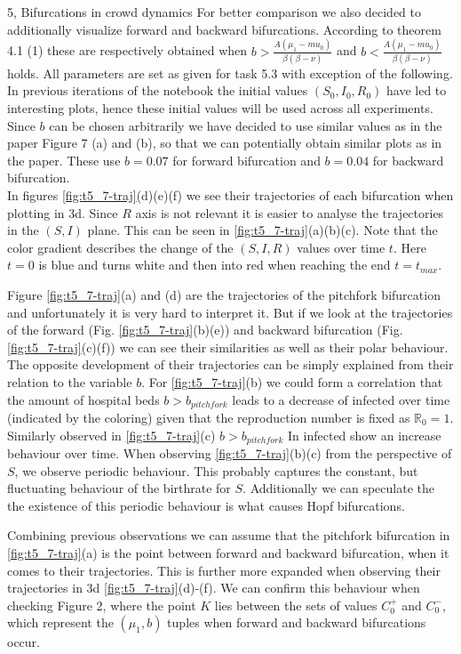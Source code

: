 \begin{task}{5, Bifurcations in crowd dynamics}
For better comparison we also decided to additionally visualize forward and backward bifurcations. According to theorem 4.1 (1) these are respectively obtained when
$b > \frac{A(\mu_1 -mu_0)}{\beta (\beta -\nu)}$ and $b < \frac{A(\mu_1 -mu_0)}{\beta (\beta -\nu)}$ holds. All parameters are set as given for task 5.3 with exception of the following. In previous iterations of the notebook the initial values $(S_0, I_0, R_0)$ have led to interesting plots, hence these initial values will be used across all experiments. Since $b$ can be chosen arbitrarily we have decided to use similar values as in the paper \cite{shan2014bifurcations} Figure 7 (a) and (b), so that we can potentially obtain similar plots as in the paper. These use $b=0.07$ for forward bifurcation and $b=0.04$ for backward bifurcation.\\

In figures \ref{fig:t5_7-traj}(d)(e)(f) we see their trajectories of each bifurcation when plotting in 3d. Since $R$ axis is not relevant it is easier to analyse the trajectories in the $(S,I)$ plane. This can be seen in \ref{fig:t5_7-traj}(a)(b)(c). Note that the color gradient describes the change of the $(S,I,R)$ values over time $t$. Here $t=0$ is blue and turns white and then into red when reaching the end $t=t_{max}$.

Figure \ref{fig:t5_7-traj}(a) and (d) are the trajectories of the pitchfork bifurcation and unfortunately it is very hard to interpret it. But if we look at the trajectories of the forward (Fig. \ref{fig:t5_7-traj}(b)(e)) and backward bifurcation (Fig. \ref{fig:t5_7-traj}(c)(f)) we can see their similarities as well as their polar behaviour. The opposite development of their trajectories can be simply explained from their relation to the variable $b$. For \ref{fig:t5_7-traj}(b) we could form a correlation that the amount of hospital beds $b>b_{pitchfork}$ leads to a decrease of infected over time (indicated by the coloring) given that the reproduction number is fixed as $\mathbb{R}_0=1$. Similarly observed in \ref{fig:t5_7-traj}(c) $b>b_{pitchfork}$ In infected show an increase behaviour over time. When observing \ref{fig:t5_7-traj}(b)(c) from the perspective of $S$, we observe periodic behaviour. This probably captures the constant, but fluctuating behaviour of the birthrate for $S$. Additionally we can speculate the the existence of this periodic behaviour is what causes Hopf bifurcations.

Combining previous observations we can assume that the pitchfork bifurcation in \ref{fig:t5_7-traj}(a) is the point between forward and backward bifurcation, when it comes to their trajectories. This is further more expanded when observing their trajectories in 3d \ref{fig:t5_7-traj}(d)-(f). We can confirm this behaviour when checking \cite{shan2014bifurcations} Figure 2, where the point $K$ lies between the sets of values $C^+_0$ and $C^-_0$, which represent the $(\mu_1,b)$ tuples when forward and backward bifurcations occur.


\end{task}

